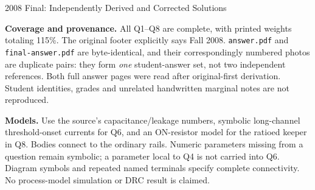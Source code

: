 \documentclass[10pt]{article}
\begin{document}
\begin{center}{\Large 2008 Final: Independently Derived and Corrected Solutions}\end{center}
\textbf{Coverage and provenance.} All Q1--Q8 are complete, with printed weights totaling 115\%. The original footer explicitly says Fall 2008. \texttt{answer.pdf} and \texttt{final-answer.pdf} are byte-identical, and their correspondingly numbered photos are duplicate pairs: they form \emph{one} student-answer set, not two independent references. Both full answer pages were read after original-first derivation. Student identities, grades and unrelated handwritten marginal notes are not reproduced.

\textbf{Models.} Use the source's capacitance/leakage numbers, symbolic long-channel threshold-onset currents for Q6, and an ON-resistor model for the ratioed keeper in Q8. Bodies connect to the ordinary rails. Numeric parameters missing from a question remain symbolic; a parameter local to Q4 is not carried into Q6. Diagram symbols and repeated named terminals specify complete connectivity. No process-model simulation or DRC result is claimed.
\end{document}
